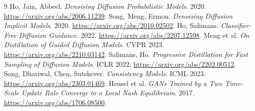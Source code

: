 \documentclass[11pt,a4paper]{article}
\begin{document}
\begin{thebibliography}{9}
 Ho, Jain, Abbeel. \emph{Denoising Diffusion Probabilistic Models}. 2020. \url{https://arxiv.org/abs/2006.11239}.
 Song, Meng, Ermon. \emph{Denoising Diffusion Implicit Models}. 2020. \url{https://arxiv.org/abs/2010.02502}.
 Ho, Salimans. \emph{Classifier-Free Diffusion Guidance}. 2022. \url{https://arxiv.org/abs/2207.12598}.
 Meng et al. \emph{On Distillation of Guided Diffusion Models}. CVPR 2023. \url{https://arxiv.org/abs/2210.03142}.
 Salimans, Ho. \emph{Progressive Distillation for Fast Sampling of Diffusion Models}. ICLR 2022. \url{https://arxiv.org/abs/2202.00512}.
 Song, Dhariwal, Chen, Sutskever. \emph{Consistency Models}. ICML 2023. \url{https://arxiv.org/abs/2303.01469}.
 Heusel et al. \emph{GANs Trained by a Two Time-Scale Update Rule Converge to a Local Nash Equilibrium}. 2017. \url{https://arxiv.org/abs/1706.08500}.
\end{thebibliography}
\end{document}
